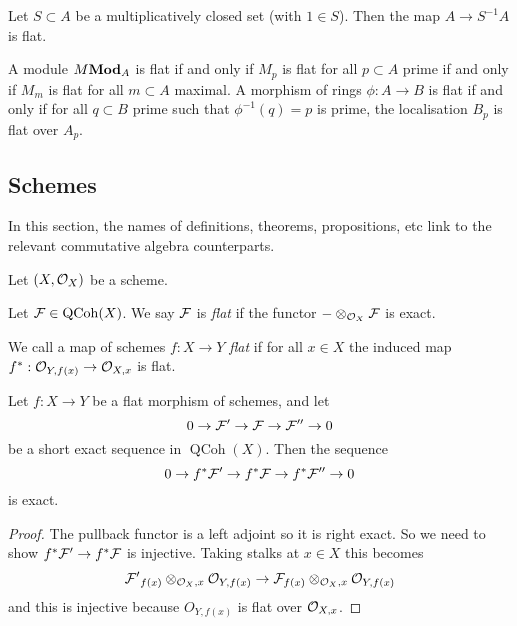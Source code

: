 \begin{proposition}
	Let $S \subset A$ be a multiplicatively closed set (with $1 \in S$). Then the map $A \to S^{-1}A$ is flat. 
\end{proposition}

\begin{proposition}\label{prop:flatness-is-local}
	A module $M \mathbf{Mod}_A$ is flat if and only if $M_p$ is flat for all $p\subset A$ prime if and only if $M_m$ is flat for all $m\subset A$ maximal.
	A morphism of rings $\phi: A \to B$ is flat if and only if for all $q \subset B$ prime such that $\phi^{-1}(q) = p$ is prime, the localisation $B_p$ is flat over $A_p$. 
\end{proposition}

\subsection{Schemes}
In this section, the names of definitions, theorems, propositions, etc link to the relevant commutative algebra counterparts.

Let $(X, \mathcal{O}_X)$ be a scheme.
\begin{definition}
	Let $\mathcal{F} \in \operatorname{QCoh}(X)$. We say $\mathcal{F}$ is \emph{flat} if the functor $-\otimes_{\mathcal{O}_X} \mathcal{F}$ is exact.
\end{definition}

\begin{definition}
	We call a map of schemes $f: X \to Y$ \emph{flat} if for all $x \in X$ the induced map $f^*: \mathcal{O}_{Y, f(x)} \to \mathcal{O}_{X, x}$ is flat.
\end{definition}

\begin{proposition}
	Let $f: X \to Y$ be a flat morphism of schemes, and let 
	\[
    	0 \to \mathcal{F}' \to \mathcal{F} \to \mathcal{F}'' \to 0
    \]
	be a short exact sequence in $\operatorname{QCoh}(X)$. Then the sequence \[
    	0 \to f^*\mathcal{F}' \to f^*\mathcal{F} \to f^*\mathcal{F}''\to 0
    \] is exact.
\end{proposition}
\begin{proof}
	The pullback functor is a left adjoint so it is right exact.
	So we need to show $f^*\mathcal{F}' \to f^*\mathcal{F}$ is injective. Taking stalks at $x \in X$ this becomes \[\mathcal{F'}_{f(x)} \otimes_{\mathcal{O}_X,x} \mathcal{O}_{Y, f(x)} \to \mathcal{F}_{f(x)} \otimes_{\mathcal{O}_X, x} \mathcal{O}_{Y, f(x)}\] and this is injective because $O_{Y, f(x)}$ is flat over $\mathcal{O}_{X,x}$. 
\end{proof}

